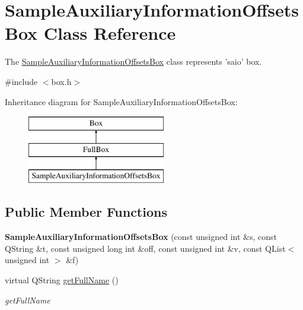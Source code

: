 \hypertarget{class_sample_auxiliary_information_offsets_box}{\section{Sample\-Auxiliary\-Information\-Offsets\-Box Class Reference}
\label{class_sample_auxiliary_information_offsets_box}
}


The \hyperlink{class_sample_auxiliary_information_offsets_box}{Sample\-Auxiliary\-Information\-Offsets\-Box} class represents 'saio' box.  




{\ttfamily \#include $<$box.\-h$>$}

Inheritance diagram for Sample\-Auxiliary\-Information\-Offsets\-Box\-:\begin{figure}[H]
\begin{center}
\leavevmode
\includegraphics[height=3.000000cm]{class_sample_auxiliary_information_offsets_box}
\end{center}
\end{figure}
\subsection*{Public Member Functions}
\begin{DoxyCompactItemize}
\item 
\hypertarget{class_sample_auxiliary_information_offsets_box_a45c6ed0747286cda2d140f6a0c778b90}{{\bfseries Sample\-Auxiliary\-Information\-Offsets\-Box} (const unsigned int \&s, const Q\-String \&t, const unsigned long int \&off, const unsigned int \&v, const Q\-List$<$ unsigned int $>$ \&f)}\label{class_sample_auxiliary_information_offsets_box_a45c6ed0747286cda2d140f6a0c778b90}

\item 
virtual Q\-String \hyperlink{class_sample_auxiliary_information_offsets_box_a40dda3a60fe8424a9f31b964909b6fa5}{get\-Full\-Name} ()
\begin{DoxyCompactList}\small\item\em get\-Full\-Name \end{DoxyCompactList}\end{DoxyCompactItemize}

